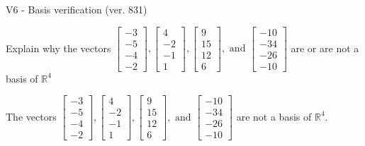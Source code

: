 \begin{exercise}
  \begin{exerciseTitle}V6 - Basis verification (ver. 831)\end{exerciseTitle}
  \begin{exerciseStatement}
    Explain why the vectors \(\left[\begin{array}{r}
-3 \\
-5 \\
-4 \\
-2
\end{array}\right] , \left[\begin{array}{r}
4 \\
-2 \\
-1 \\
1
\end{array}\right] , \left[\begin{array}{r}
9 \\
15 \\
12 \\
6
\end{array}\right] , \text{ and } \left[\begin{array}{r}
-10 \\
-34 \\
-26 \\
-10
\end{array}\right]\) are or are not a basis of \(\mathbb{R}^4\)	


  \end{exerciseStatement}
  \begin{exerciseAnswer}
   The vectors \(\left[\begin{array}{r}
-3 \\
-5 \\
-4 \\
-2
\end{array}\right] , \left[\begin{array}{r}
4 \\
-2 \\
-1 \\
1
\end{array}\right] , \left[\begin{array}{r}
9 \\
15 \\
12 \\
6
\end{array}\right] , \text{ and } \left[\begin{array}{r}
-10 \\
-34 \\
-26 \\
-10
\end{array}\right]\) 
  	 are not  a basis of \(\mathbb{R}^4\).
  


  \end{exerciseAnswer}
\end{exercise}